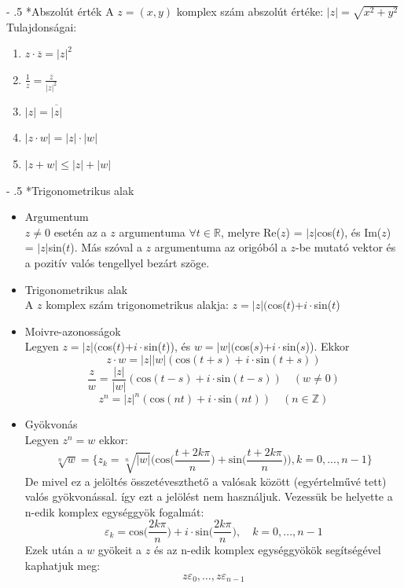 \documentclass[12pt,margin=0px]{article}
\makeatletter
\newcommand\ddfrac[2]{\frac{\displaystyle #1}{\displaystyle #2}}
\newcommand{\Z}{\mathbb{Z}}
\newcommand{\R}{\mathbb{R}}
\renewcommand\paragraph{%
	\@startsection{paragraph}{4}{0mm}%
	{-\baselineskip}%
	{.5\baselineskip}%
	{\normalfont\normalsize\bfseries}}
\makeatother
\begin{document}
        \paragraph*{Abszolút érték}
        A $z=(x,y)$ komplex szám abszolút értéke: $|z| = \sqrt{x^2+y^2}$\\
        \noindent Tulajdonságai:
        \begin{enumerate}
        \item $z\cdot\overline{z} = {|z|}^2$
        \item $\ddfrac{1}{z}= \ddfrac{\overline{z}}{|z|^2} $
        \item $|z| = \overline{|z|}$
        \item $|z\cdot w | = |z|\cdot|w|$
        \item $|z+w| \leq |z| +|w|$
        \end{enumerate}
        \paragraph*{Trigonometrikus alak} \hfill
        \begin{itemize}[leftmargin=5.5mm]
        \renewcommand{\labelitemi}{$\vcenter{\hbox{\tiny$\bullet$}}$}
        \item Argumentum \\
        	$z \neq 0$ esetén az a $z$ argumentuma $\forall t \in\R$, melyre Re($z$) = $|z|$cos($t$), és Im($z$) = $|z|$sin($t$). Más szóval a $z$ argumentuma az origóból a $z$-be mutató vektor és a pozitív valós tengellyel bezárt szöge.
        \item Trigonometrikus alak \\
        	A $z$ komplex szám trigonometrikus alakja: $ z = |z|($cos($t$)+$i\cdot$sin($t$)
        \item Moivre-azonosságok \\
        	Legyen $z = |z|($cos($t$)+$i\cdot$sin($t$)), és $w = |w|($cos($s$)+$i\cdot$sin($s$)). Ekkor
        	\[z\cdot w = |z||w|(\textrm{cos}(t+s)+i\cdot \textrm{sin}(t+s))\]
        	\[\ddfrac{z}{w} = \ddfrac{|z|}{|w|}(\textrm{cos}(t-s)+i\cdot \textrm{sin}(t-s)) \quad (w \neq 0)\]
        	\[ z^n = |z|^n(\textrm{cos}(nt)+i\cdot \textrm{sin}(nt)) \quad (n \in \Z)\]
        \item Gyökvonás \\
        	Legyen $z^n = w$ ekkor:
        	\[ \sqrt[n]{w} = \Bigg\{z_k = \sqrt[n]{|w|}\bigg(\textrm{cos}\Big(\ddfrac{t+2k\pi}{n}\Big)+\textrm{sin}\Big(\ddfrac{t+2k\pi}{n}\Big)\bigg), k=0,...,n-1\Bigg\} \]
        	De mivel ez a jelöltés összetéveszthető a valósak között (egyértelművé tett) valós gyökvonással. így ezt a jelölést nem használjuk. Vezessük be helyette a n-edik komplex egységgyök fogalmát:
        	\[\varepsilon_k = \textrm{cos}\bigg(\ddfrac{2k\pi}{n}\bigg)+i\cdot\textrm{sin}\bigg(\ddfrac{2k\pi}{n}\bigg), \quad k=0,...,n-1\]
        	Ezek után a $w$ gyökeit a $z$ és az n-edik komplex egységgyökök segítségével kaphatjuk meg:
        \[
            z\varepsilon_0, \ldots, z\varepsilon_{n-1}
        \]
        \end{itemize}
\end{document}
